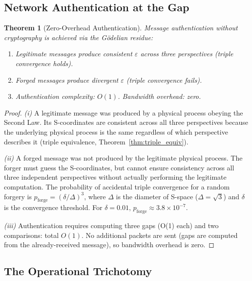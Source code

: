 \documentclass[11pt,twocolumn,a4paper]{article}
\newtheorem{theorem}{Theorem}[section]
\theoremstyle{definition}
\newcommand{\eps}{\varepsilon}
\begin{document}
\subsection{Network Authentication at the Gap}\label{sec:godelian:auth}

\begin{theorem}[Zero-Overhead Authentication]\label{thm:zero_auth}
Message authentication without cryptography is achieved via the G\"odelian residue:
\begin{enumerate}[label=(\roman*)]
  \item Legitimate messages produce consistent $\eps$ across three perspectives
        (triple convergence holds).
  \item Forged messages produce divergent $\eps$ (triple convergence fails).
  \item Authentication complexity: $O(1)$. Bandwidth overhead: zero.
\end{enumerate}
\end{theorem}

\begin{proof}
\emph{(i)} A legitimate message was produced by a physical process obeying the Second
Law. Its S-coordinates are consistent across all three perspectives because the underlying
physical process is the same regardless of which perspective describes it (triple
equivalence, Theorem~\ref{thm:triple_equiv}).

\emph{(ii)} A forged message was not produced by the legitimate physical process.
The forger must guess the S-coordinates, but cannot ensure consistency across all three
independent perspectives without actually performing the legitimate computation. The
probability of accidental triple convergence for a random forgery is
$p_{\mathrm{forge}} = (\delta/\Delta)^3$, where $\Delta$ is the diameter of S-space
($\Delta = \sqrt{3}$) and $\delta$ is the convergence threshold. For $\delta = 0.01$,
$p_{\mathrm{forge}} \approx 3.8 \times 10^{-7}$.

\emph{(iii)} Authentication requires computing three gaps (O(1) each) and two comparisons:
total $O(1)$. No additional packets are sent (gaps are computed from the already-received
message), so bandwidth overhead is zero.
\end{proof}

\subsection{The Operational Trichotomy}\label{sec:godelian:trichotomy}
\end{document}
